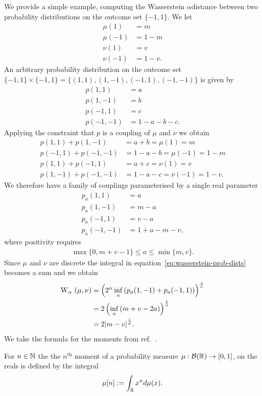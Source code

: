 We provide a simple example, computing the Wasserstein $\alpha$distance between two probability distributions on the outcome set $\{-1,1\}$. We let 
\begin{align}
  \mu(1) &= m\\
  \mu(-1) &= 1-m\\
  \nu(1) &= v\\
  \nu(-1) &= 1-v.
\end{align}
An arbitrary probability distribution on the outcome set $\{-1,1\}\times \{-1,1\} = \{(1,1), (1,-1), (-1,1), (-1,-1)\}$ is given by
\begin{align}
  p(1,1) &= a\\
  p(1,-1) &= b\\
  p(-1,1) &= c\\
  p(-1,-1) &= 1-a-b-c.
\end{align}
Applying the constraint that $p$ is a coupling of $\mu$ and $\nu$ we obtain
\begin{align}
  p(1,1) + p(1,-1) &= a+b = \mu(1) = m\\
  p(-1,1) + p(-1,-1) &= 1-a-b = \mu(-1) = 1-m\\
  p(1,1) + p(-1,1) &= a+c = \nu(1) = v\\
  p(1,-1) + p(-1,-1) &= 1-a-c = \nu(-1) = 1-v.
\end{align}
We therefore have a family of couplings parameterised by a single real parameter
\begin{align}
  p_a(1,1) &= a\\
  p_a(1,-1) &= m-a\\
  p_a(-1,1) &= v-a\\
  p_a(-1,-1) &= 1+a-m-v,
\end{align}
where positivity requires
\begin{align}
  \max\{0, m+v-1\} \leq a \leq \min\{m,v\}.
\end{align}
Since $\mu$ and $\nu$ are discrete the integral in equation~\ref{eq:wasserstein-prob-dists} becomes a sum and we obtain
\begin{align}
  \ws{\mu,\nu}[\alpha] &= \left(2^\alpha\inf_a\left(p_a(1,-1) + p_a(-1,1)\right)\right)^\frac{1}{\alpha}\\
                       &= 2 \left(\inf_a \left(m+v - 2a\right)\right)^\frac{1}{\alpha}\\
                       &= 2 \abs{m-v}^\frac{1}{\alpha}.
\end{align}
We take the formula for the moments from ref.~\cite{statistical-inference}.
\begin{defn}[Moments]\label{defn:moments}
  For $n\in\mathbb{N}$ the the $n^\text{th}$ moment of a probability measure $\mu:\mathcal{B}(\mathbb{R})\to [0,1]$, on the reals is defined by the integral
  \begin{align}
    \mu[n] := \int_{\mathbb{R}} x^n d\mu(x).
  \end{align}
\end{defn}
